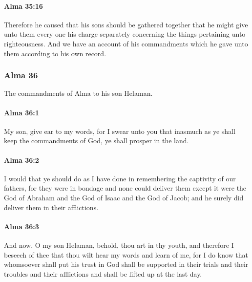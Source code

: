 		\paragraph{Alma 35:16} %
			\label{ALMA-35-16}

			Therefore he caused that his sons should be gathered together
			that he might give unto them every one his charge separately
			concerning the things pertaining unto righteousness.
			And we have an account of his commandments which he gave unto them
			according to his own record.

	\subsubsection{Alma 36} %
		\label{ALMA-36}
		
		The commandments of Alma to his son Helaman.
		
		\paragraph{Alma 36:1} %
			\label{ALMA-36-1}

			My son, give ear to my words,
			for I swear unto you
			that inasmuch as ye shall keep the commandments of God,
			ye shall prosper in the land.

		\paragraph{Alma 36:2} %
			\label{ALMA-36-2}

			I would that ye should do as I have done
			in remembering the captivity of our fathers,
			for they were in bondage and none could deliver them
			except it were the God of Abraham and the God of Isaac and the God of Jacob;
			and he surely did deliver them in their afflictions.

		\paragraph{Alma 36:3} %
			\label{ALMA-36-3}

			And now, O my son Helaman,
			behold, thou art in thy youth,
			and therefore I beseech of thee
			that thou wilt hear my words and learn of me,
			for I do know that whomsoever shall put his trust in God
			shall be supported in their trials and their troubles and their afflictions
			and shall be lifted up at the last day.

